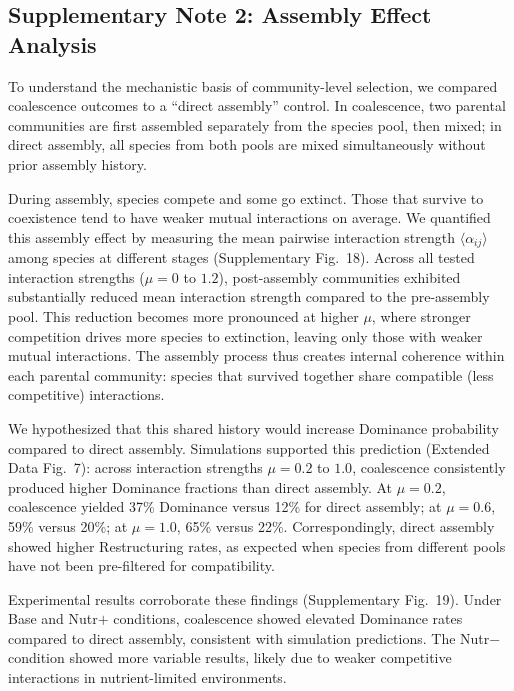 \subsection*{Supplementary Note 2: Assembly Effect Analysis}
\label{sec:suppl:note2}

To understand the mechanistic basis of community-level selection, we compared coalescence outcomes to a ``direct assembly'' control. In coalescence, two parental communities are first assembled separately from the species pool, then mixed; in direct assembly, all species from both pools are mixed simultaneously without prior assembly history.

During assembly, species compete and some go extinct. Those that survive to coexistence tend to have weaker mutual interactions on average. We quantified this assembly effect by measuring the mean pairwise interaction strength $\langle \alpha_{ij} \rangle$ among species at different stages (Supplementary Fig.~18). Across all tested interaction strengths ($\mu = 0$ to $1.2$), post-assembly communities exhibited substantially reduced mean interaction strength compared to the pre-assembly pool. This reduction becomes more pronounced at higher $\mu$, where stronger competition drives more species to extinction, leaving only those with weaker mutual interactions. The assembly process thus creates internal coherence within each parental community: species that survived together share compatible (less competitive) interactions.

We hypothesized that this shared history would increase Dominance probability compared to direct assembly. Simulations supported this prediction (Extended Data Fig.~7): across interaction strengths $\mu = 0.2$ to $1.0$, coalescence consistently produced higher Dominance fractions than direct assembly. At $\mu = 0.2$, coalescence yielded 37\% Dominance versus 12\% for direct assembly; at $\mu = 0.6$, 59\% versus 20\%; at $\mu = 1.0$, 65\% versus 22\%. Correspondingly, direct assembly showed higher Restructuring rates, as expected when species from different pools have not been pre-filtered for compatibility.

Experimental results corroborate these findings (Supplementary Fig.~19). Under Base and Nutr$+$ conditions, coalescence showed elevated Dominance rates compared to direct assembly, consistent with simulation predictions. The Nutr$-$ condition showed more variable results, likely due to weaker competitive interactions in nutrient-limited environments.

